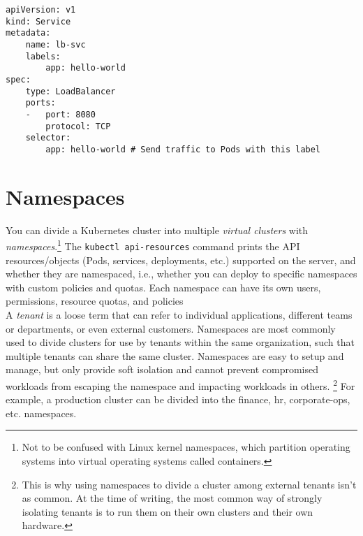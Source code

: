 \documentclass[8pt, table, xcdraw]{article}%
\begin{document}
\begin{lstlisting}
apiVersion: v1
kind: Service
metadata:
    name: lb-svc
    labels:
        app: hello-world
spec:
    type: LoadBalancer
    ports:
    -   port: 8080
        protocol: TCP
    selector:
        app: hello-world # Send traffic to Pods with this label
\end{lstlisting}

\section{Namespaces}

You can divide a Kubernetes cluster into multiple \emph{virtual clusters} with \emph{namespaces}.\footnote{Not to be confused with Linux kernel namespaces, which partition operating systems into virtual operating systems called containers.} The \lstinline{kubectl api-resources} command prints the API resources/objects (Pods, services, deployments, etc.) supported on the server, and whether they are namespaced, i.e., whether you can deploy to specific namespaces with custom policies and quotas. Each namespace can have its own users, permissions, resource quotas, and policies\\
A \emph{tenant} is a loose term that can refer to individual applications, different teams or departments, or even external customers. Namespaces are most commonly used to divide clusters for use by tenants within the same organization, such that multiple tenants can share the same cluster. Namespaces are easy to setup and manage, but only provide soft isolation and cannot prevent compromised workloads from escaping the namespace and impacting workloads in others. \footnote{This is why using namespaces to divide a cluster among external tenants isn’t as common. At the time of writing, the most common way of strongly isolating tenants is to run them on their own clusters and their own hardware.} For example, a production cluster can be divided into the finance, hr, corporate-ops, etc. namespaces.
\end{document}
